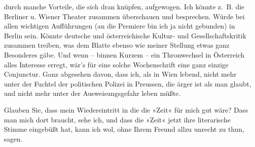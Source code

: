                durch manche Vorteile, {\pb}die
               sich dran knüpfen, aufgewogen. Ich könnte z. B. die Berliner u. Wiener Theater zusammen
               überschauen und besprechen. Würde bei allen wichtigen Aufführungen (an die Premiere
               bin ich ja nicht gebunden) in Berlin sein. Könnte
                  deutsche und österreichische Kultur- und
               Gesellschaftskritik zusammen treiben, was dem Blatte ebenso wie meiner Stellung etwas ganz Besonderes gäbe. Und wenn – binnen Kurzem
               – ein Thronwechsel in Österreich alles
               Interesse erregt, wär’s für eine solche Wochenschrift eine ganz einzige Conjunctur.
               Ganz abgesehen davon, dass ich, als in Wien
               lebend, nicht mehr unter der Fuchtel der politischen Polizei in Preussen, die ärger ist als man glaubt, und nicht mehr unter
               der Ausweisungsgefahr leben müßte.\pend
           
\pstart
           Glauben Sie, dass mein Wiedereintritt in die die »Zeit« für mich gut wäre? Dass man mich dort braucht, sehe ich, und dass die
                  »Zeit« jetzt ihre literarische Stimme
               eingebüßt hat, kann ich wol, ohne Ihrem Freund \label{K_L03430-5v}\label{K_L03430-5} allzu unrecht zu thun, sagen.\pend
           
